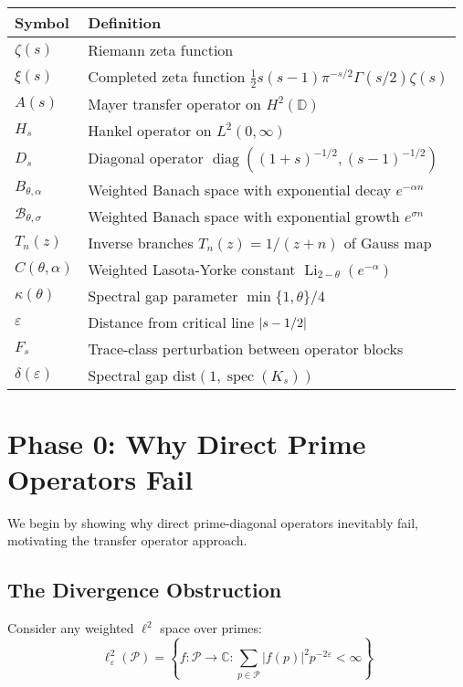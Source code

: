 \documentclass[11pt,a4paper]{article}
\theoremstyle{definition}
\theoremstyle{remark}
\newcommand{\C}{\mathbb{C}}
\newcommand{\calP}{\mathcal{P}}
\DeclareMathOperator{\spec}{spec}
\let\Re\relax
\DeclareMathOperator{\Re}{Re}
\begin{document}
\begin{center}
\begin{tabular}{|l|l|}
\hline
\textbf{Symbol} & \textbf{Definition} \\
\hline
$\zeta(s)$ & Riemann zeta function \\
$\xi(s)$ & Completed zeta function $\frac{1}{2}s(s-1)\pi^{-s/2}\Gamma(s/2)\zeta(s)$ \\
$A(s)$ & Mayer transfer operator on $H^2(\mathbb{D})$ \\
$H_s$ & Hankel operator on $L^2(0,\infty)$ \\
$D_s$ & Diagonal operator $\operatorname{diag}((1+s)^{-1/2}, (s-1)^{-1/2})$ \\
$B_{\theta,\alpha}$ & Weighted Banach space with exponential decay $e^{-\alpha n}$ \\
$\mathcal{B}_{\theta,\sigma}$ & Weighted Banach space with exponential growth $e^{\sigma n}$ \\
$T_n(z)$ & Inverse branches $T_n(z) = 1/(z+n)$ of Gauss map \\
$C(\theta,\alpha)$ & Weighted Lasota-Yorke constant $\operatorname{Li}_{2-\theta}(e^{-\alpha})$ \\
$\kappa(\theta)$ & Spectral gap parameter $\min\{1,\theta\}/4$ \\
$\varepsilon$ & Distance from critical line $|\Re s - 1/2|$ \\
$F_s$ & Trace-class perturbation between operator blocks \\
$\delta(\varepsilon)$ & Spectral gap $\text{dist}(1, \spec(K_s))$ \\
\hline
\end{tabular}
\end{center}

\section{Phase 0: Why Direct Prime Operators Fail}\label{sec:phase0}

We begin by showing why direct prime-diagonal operators inevitably fail, motivating the transfer operator approach.

\subsection{The Divergence Obstruction}

Consider any weighted $\ell^2$ space over primes:
\[
\ell^2_\varepsilon(\calP) = \left\{ f: \calP \to \C : \sum_{p \in \calP} |f(p)|^2 p^{-2\varepsilon} < \infty \right\}
\]
\end{document}
